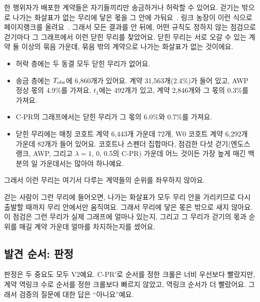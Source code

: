 한 행위자가 배포한 계약들은 자기들끼리만 송금하거나 허락할 수 있어요. 걷기는 밖으로 나가는 화살표가 없는 무리에 닿은 몫을 그 안에 가둬요~\cite{langville2006pagerank}. 링크 농장이 이런 식으로 페이지랭크를 올려요~\cite{gyongyi2005alliances}. 그래서 모든 결과를 안 뒤에, 어떤 규칙도 정하지 않는 점검으로 걷기마다 그 그래프에서 이런 닫힌 무리를 찾았어요. 닫힌 무리는 서로 오갈 수 있는 계약 둘 이상의 묶음 가운데, 묶음 밖의 계약으로 나가는 화살표가 없는 것이에요.
\begin{itemize}
\item 허락 층에는 두 동결 모두 닫힌 무리가 없어요.
\item 송금 층에는 $T_{\mathrm{obs}}$에 6,860개가 있어요. 계약 31,563개(2.4\%)가 들어 있고, AWP 정상 몫의 4.9\%를 가져요. $t_1$에는 492개가 있고, 계약 2,846개와 그 몫의 0.3\%를 가져요.
\item C-PR의 그래프에서는 닫힌 무리가 그 몫의 6.0\%와 0.7\%를 가져요.
\item 닫힌 무리에는 매칭 코호트 계약 6,443개 가운데 72개, W0 코호트 계약 6,292개 가운데 82개가 들어 있어요. 코호트나 스펜더 집합마다, 점검한 다섯 걷기(엔도스랭크, AWP, 그리고 $\lambda=1$, 0, 0.5의 C-PR) 가운데 어느 것이든 가장 높게 매긴 백분의 일 가운데서는 많아야 하나예요.
\end{itemize}
그래서 이런 무리는 여기서 다루는 계약들의 순위를 좌우하지 않아요.

\begin{puri}
걷는 사람이 그런 무리에 들어오면, 나가는 화살표가 모두 무리 안을 가리키므로 다시 출발할 때까지 무리 안에서만 움직여요. 그래서 무리에 닿은 몫은 밖으로 새지 않아요. 이 점검은 그런 무리가 실제 그래프에 얼마나 있는지, 그리고 그 무리가 걷기의 몫과 순위를 매길 계약 가운데 얼마를 차지하는지를 셌어요.
\end{puri}

\subsection{발견 순서: 판정}
\label{sec:decision}

\begin{yoji}
판정은 두 중요도 모두 V2예요. C-PR$'$로 순서를 정한 크롤은 너비 우선보다 빨랐지만, 계약 역링크 수로 순서를 정한 크롤보다 빠르지 않았고, 역링크 순서가 더 빨랐어요. 그래서 검증의 질문에 대한 답은 “아니요”예요.
\end{yoji}

